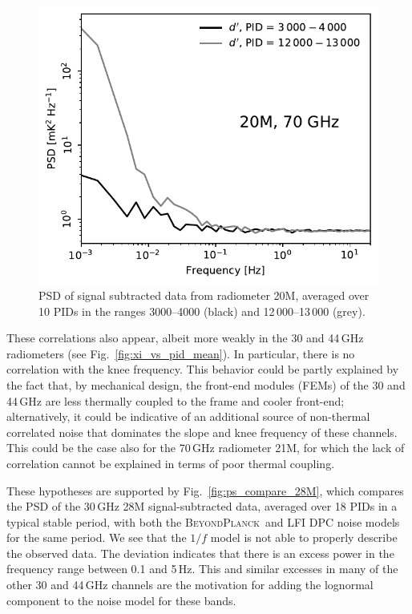 \documentclass{aa}
\newcommand{\BP}{\textsc{BeyondPlanck}}
\begin{document}
\begin{figure}
        \begin{center}
                \includegraphics[width=\linewidth]{figs/ps_running_mean_20M.pdf}
        \end{center}
        \caption{PSD of signal subtracted data from radiometer 20M, averaged over 10
                PIDs in the ranges 3000--4000 (black) and 12\,000--13\,000 (grey). 
                \label{fig:ps_compare_sorption}}
\end{figure}

These correlations also appear, albeit more weakly in the 30
and 44\,GHz radiometers (see Fig.~\ref{fig:xi_vs_pid_mean}). In
particular, there is no correlation with the knee frequency. This
behavior could be partly explained by the fact that, by mechanical
design, the front-end modules (FEMs) of the 30 and 44\,GHz are less
thermally coupled to the frame and cooler front-end; alternatively, it could be
indicative of an additional source of non-thermal correlated noise
that dominates the slope and knee frequency of these channels. This
could be the case also for the 70\,GHz radiometer 21M, for which the
lack of correlation cannot be explained in terms of poor thermal
coupling.

These hypotheses are supported by Fig.~\ref{fig:ps_compare_28M},
which compares the PSD of the 30\,GHz 28M signal-subtracted data,
averaged over 18 PIDs in a typical stable period, with both the
\BP\ and LFI DPC noise models for the same period. We see that the $1/f$ 
model is not able to properly describe the observed data. The deviation
indicates that there is an excess power in the frequency range between
0.1 and 5\,Hz. This and similar excesses in many of the other 30 and 44\,GHz channels are the motivation for adding the lognormal component 
to the noise model for these bands. 
\end{document}
